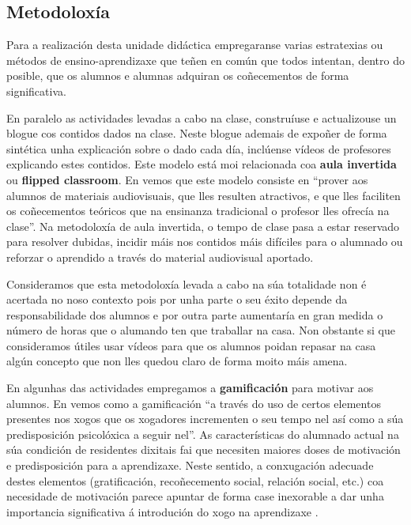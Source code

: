 \subsection{Metodoloxía}

Para a realización desta unidade didáctica empregaranse varias estratexias ou métodos de ensino-aprendizaxe que teñen en común que todos intentan, dentro do posible, que os alumnos e alumnas adquiran os coñecementos de forma significativa.

En paralelo as actividades levadas a cabo na clase, construíuse e actualizouse un blogue cos contidos dados na clase. Neste blogue ademais de expoñer de forma sintética unha explicación sobre o dado cada día, inclúense vídeos de profesores explicando estes contidos. Este modelo está moi relacionada coa \textbf{aula invertida} ou \textbf{flipped classroom}. En \cite[p. 1]{saez2014experiencia} vemos que este modelo consiste en ``prover aos alumnos de materiais audiovisuais, que lles resulten atractivos, e que lles faciliten os coñecementos teóricos que na ensinanza tradicional o profesor lles ofrecía na clase''. Na metodoloxía de aula invertida, o tempo de clase pasa a estar reservado para resolver dubidas, incidir máis nos contidos máis difíciles para o alumnado ou reforzar o aprendido a través do material audiovisual aportado.

Consideramos que esta metodoloxía levada a cabo na súa totalidade non é acertada no noso contexto pois por unha parte o seu éxito depende da responsabilidade dos alumnos e por outra parte aumentaría en gran medida o número de horas que o alumando ten que traballar na casa. Non obstante si que consideramos útiles usar vídeos para que os alumnos poidan repasar na casa algún concepto que non lles quedou claro de forma moito máis amena.

En algunhas das actividades empregamos a \textbf{gamificación} para motivar aos alumnos. En \cite{diaz2013potencial} vemos como a gamificación ``a través do uso de certos elementos presentes nos xogos que os xogadores incrementen o seu tempo nel así como a súa predisposición psicolóxica a seguir nel''. As características do alumnado actual na súa condición de residentes dixitais \cite{residentesdigitales} fai que necesiten maiores doses de motivación e predisposición para a aprendizaxe. Neste sentido, a conxugación adecuade destes elementos (gratificación, recoñecemento social, relación social, etc.) coa necesidade de motivación parece apuntar de forma case inexorable a dar unha importancia significativa á introdución do xogo na aprendizaxe \cite{gamificacion2}.


